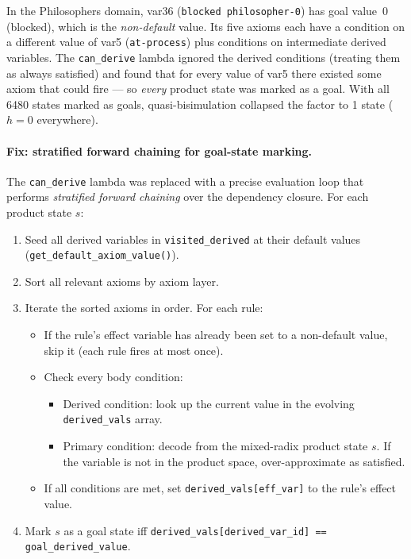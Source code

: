\documentclass[11pt,a4paper]{article}
\begin{document}
In the Philosophers domain, var36 (\texttt{blocked philosopher-0}) has goal
value~0 (blocked), which is the \emph{non-default} value.  Its five axioms each
have a condition on a different value of var5 (\texttt{at-process}) plus
conditions on intermediate derived variables.  The \texttt{can\_derive} lambda
ignored the derived conditions (treating them as always satisfied) and found
that for every value of var5 there existed some axiom that could fire — so
\emph{every} product state was marked as a goal.  With all 6480 states marked
as goals, quasi-bisimulation collapsed the factor to 1 state ($h = 0$
everywhere).

\paragraph{Fix: stratified forward chaining for goal-state marking.}

The \texttt{can\_derive} lambda was replaced with a precise evaluation loop
that performs \emph{stratified forward chaining} over the dependency closure.
For each product state $s$:

\begin{enumerate}
  \item Seed all derived variables in \texttt{visited\_derived} at their
        default values (\texttt{get\_default\_axiom\_value()}).
  \item Sort all relevant axioms by axiom layer.
  \item Iterate the sorted axioms in order.  For each rule:
    \begin{itemize}
      \item If the rule's effect variable has already been set to a non-default
            value, skip it (each rule fires at most once).
      \item Check every body condition:
        \begin{itemize}
          \item Derived condition: look up the current value in the evolving
                \texttt{derived\_vals} array.
          \item Primary condition: decode from the mixed-radix product state $s$.
                If the variable is not in the product space, over-approximate
                as satisfied.
        \end{itemize}
      \item If all conditions are met, set \texttt{derived\_vals[eff\_var]}
            to the rule's effect value.
    \end{itemize}
  \item Mark $s$ as a goal state iff
        \texttt{derived\_vals[derived\_var\_id] == goal\_derived\_value}.
\end{enumerate}
\end{document}
